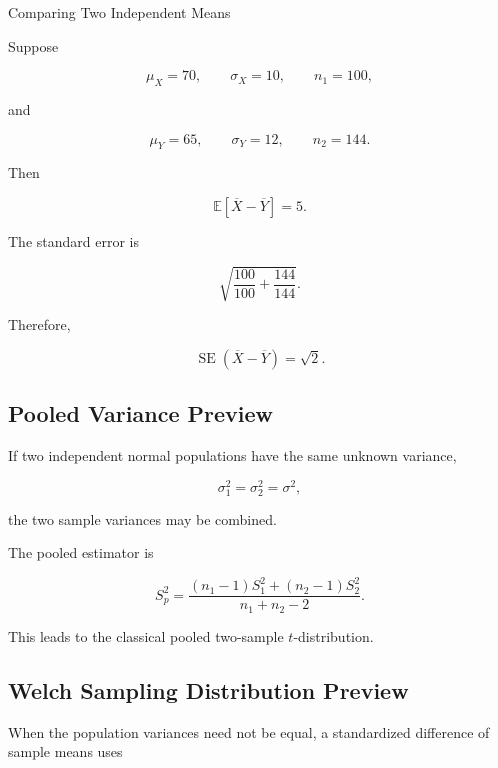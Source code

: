\begin{workedexamplebox}{Comparing Two Independent Means}

Suppose

\[
\mu_X=70,
\qquad
\sigma_X=10,
\qquad
n_1=100,
\]

and

\[
\mu_Y=65,
\qquad
\sigma_Y=12,
\qquad
n_2=144.
\]

Then

\[
\mathbb{E}
[
\overline{X}-\overline{Y}
]
=
5.
\]

The standard error is

\[
\sqrt{
\frac{100}{100}
+
\frac{144}{144}
}.
\]

Therefore,

\begin{answerbox}
\[
\boxed{
\operatorname{SE}
(
\overline{X}-\overline{Y}
)
=
\sqrt{2}.
}
\]
\end{answerbox}

\end{workedexamplebox}

\subsection{Pooled Variance Preview}
\label{subsec:pooled-variance-preview}

If two independent normal populations have the same unknown variance,

\[
\sigma_1^2=\sigma_2^2=\sigma^2,
\]

the two sample variances may be combined.

The pooled estimator is

\[
\boxed{
S_p^2
=
\frac{
(n_1-1)S_1^2
+
(n_2-1)S_2^2
}{
n_1+n_2-2
}.
}
\]

This leads to the classical pooled two-sample \(t\)-distribution.

\subsection{Welch Sampling Distribution Preview}
\label{subsec:welch-sampling-preview}

When the population variances need not be equal, a standardized
difference of sample means uses

